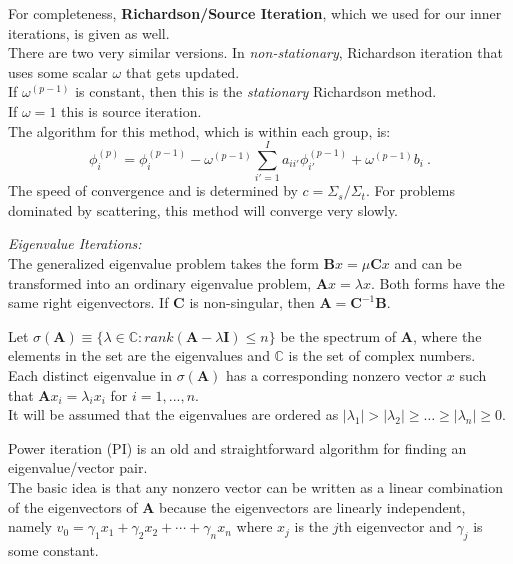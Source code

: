 \documentclass[12pt]{article}
\newcommand{\ve}[1]{\ensuremath{\mathbf{#1}}}
\begin{document}
For completeness, \textbf{Richardson/Source Iteration}, which we used for our inner iterations, is given as well.\\ 
There are two very similar versions. In \textit{non-stationary}, Richardson iteration that uses some scalar $\omega$ that gets updated.\\
If $\omega^{(p-1)}$ is constant, then this is the \textit{stationary} Richardson method. \\ 
If $\omega = 1$ this is source iteration.\\
The algorithm for this method, which is within each group, is:
\[\phi_{i}^{(p)} =  \phi^{(p-1)}_{i} - \omega^{(p-1)} \sum_{i'=1}^{I} a_{ii'}\phi_{i'}^{(p-1)} + \omega^{(p-1)} b_i \:.\]
%
The speed of convergence and is determined by $c = \Sigma_s / \Sigma_t$. For problems dominated by scattering, this method will converge very slowly. 


\textit{Eigenvalue Iterations:}\\
The generalized eigenvalue problem takes the form $\ve{B}x = \mu \ve{C}x$ and can be transformed into an ordinary eigenvalue problem, $\ve{A}x= \lambda x$. Both forms have the same right eigenvectors. If $\ve{C}$ is non-singular, then $\ve{A} = \ve{C}^{-1}\ve{B}$.

Let $\sigma(\ve{A}) \equiv \{\lambda \in \mathbb{C} : rank(\ve{A} - \lambda \ve{I}) \le n\}$ be the spectrum of $\ve{A}$, where the elements in the set are the eigenvalues and $\mathbb{C}$ is the set of complex numbers.\\ %
Each distinct eigenvalue in $\sigma(\ve{A})$ has a corresponding nonzero vector $x$ such that $\ve{A}x_{i} = \lambda_{i} x_{i}$ for $i = 1,...,n$.\\
It will be assumed that the eigenvalues are ordered as $|\lambda_{1}| > |\lambda_{2}| \ge \dots \ge |\lambda_{n}| \ge 0$. 

Power iteration (PI) is an old and straightforward algorithm for finding an eigenvalue/vector pair. \\
The basic idea is that any nonzero vector can be written as a linear combination of the eigenvectors of $\ve{A}$ because the eigenvectors are linearly independent, namely $v_0 = \gamma_1 x_1 + \gamma_2 x_2 + \cdots + \gamma_n x_n$ where $x_{j}$ is the $j$th eigenvector and $\gamma_{j}$ is some constant.
\end{document}
